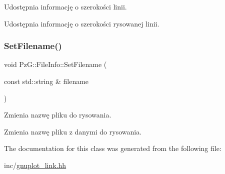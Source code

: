 Udostępnia informację o szerokości linii. 

Udostępnia informację o szerokości rysowanej linii. \mbox{\label{class_pz_g_1_1_file_info_a02c728f892c6f169b738adac8ed9d5f1}} 
\subsubsection{\texorpdfstring{Set\+Filename()}{SetFilename()}}
{\footnotesize\ttfamily void Pz\+G\+::\+File\+Info\+::\+Set\+Filename (\begin{DoxyParamCaption}\item[{const std\+::string \&}]{filename }\end{DoxyParamCaption})\hspace{0.3cm}{\ttfamily [inline]}}



Zmienia nazwę pliku do rysowania. 

Zmienia nazwę pliku z danymi do rysowania. 

The documentation for this class was generated from the following file\+:\begin{DoxyCompactItemize}
\item 
inc/\hyperlink{gnuplot__link_8hh}{gnuplot\+\_\+link.\+hh}\end{DoxyCompactItemize}
